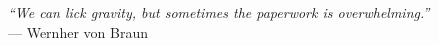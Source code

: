 \begin{epigraph}

\vspace*{-0.25in}
\begin{center}
\vspace*{\fill}

\textit{``We can lick gravity, but sometimes the paperwork is overwhelming.''}
\\
--- Wernher von Braun
\vspace*{\fill}
\end{center}

\end{epigraph}